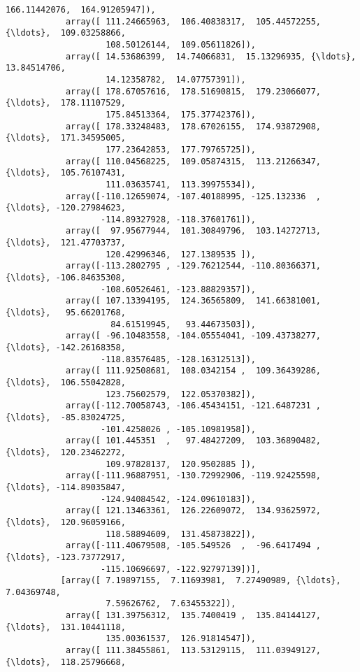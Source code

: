 \documentclass[11pt]{article}
\begin{document}
\begin{Verbatim}[commandchars=\\\{\}]
                    166.11442076,  164.91205947]),
            array([ 111.24665963,  106.40838317,  105.44572255, {\ldots},  109.03258866,
                    108.50126144,  109.05611826]),
            array([ 14.53686399,  14.74066831,  15.13296935, {\ldots},  13.84514706,
                    14.12358782,  14.07757391]),
            array([ 178.67057616,  178.51690815,  179.23066077, {\ldots},  178.11107529,
                    175.84513364,  175.37742376]),
            array([ 178.33248483,  178.67026155,  174.93872908, {\ldots},  171.34595005,
                    177.23642853,  177.79765725]),
            array([ 110.04568225,  109.05874315,  113.21266347, {\ldots},  105.76107431,
                    111.03635741,  113.39975534]),
            array([-110.12659074, -107.40188995, -125.132336  , {\ldots}, -120.27984623,
                   -114.89327928, -118.37601761]),
            array([  97.95677944,  101.30849796,  103.14272713, {\ldots},  121.47703737,
                    120.42996346,  127.1389535 ]),
            array([-113.2802795 , -129.76212544, -110.80366371, {\ldots}, -106.84635308,
                   -108.60526461, -123.88829357]),
            array([ 107.13394195,  124.36565809,  141.66381001, {\ldots},   95.66201768,
                     84.61519945,   93.44673503]),
            array([ -96.10483558, -104.05554041, -109.43738277, {\ldots}, -142.26168358,
                   -118.83576485, -128.16312513]),
            array([ 111.92508681,  108.0342154 ,  109.36439286, {\ldots},  106.55042828,
                    123.75602579,  122.05370382]),
            array([-112.70058743, -106.45434151, -121.6487231 , {\ldots},  -85.83024725,
                   -101.4258026 , -105.10981958]),
            array([ 101.445351  ,   97.48427209,  103.36890482, {\ldots},  120.23462272,
                    109.97828137,  120.9502885 ]),
            array([-111.96887951, -130.72992906, -119.92425598, {\ldots}, -114.89035847,
                   -124.94084542, -124.09610183]),
            array([ 121.13463361,  126.22609072,  134.93625972, {\ldots},  120.96059166,
                    118.58894609,  131.45873822]),
            array([-111.40679508, -105.549526  ,  -96.6417494 , {\ldots}, -123.73772917,
                   -115.10696697, -122.92797139])],
           [array([ 7.19897155,  7.11693981,  7.27490989, {\ldots},  7.04369748,
                    7.59626762,  7.63455322]),
            array([ 131.39756312,  135.7400419 ,  135.84144127, {\ldots},  131.10441118,
                    135.00361537,  126.91814547]),
            array([ 111.38455861,  113.53129115,  111.03949127, {\ldots},  118.25796668,

\end{Verbatim}
\end{document}
